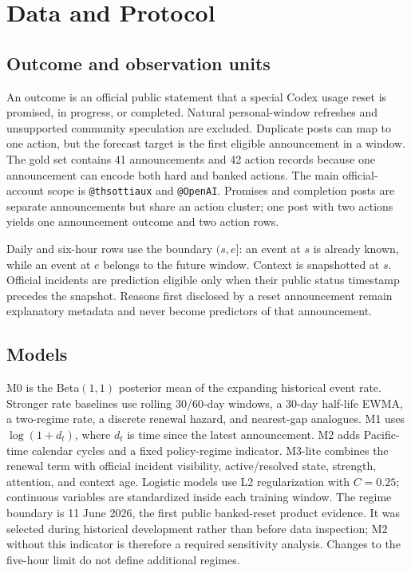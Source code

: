 \section{Data and Protocol}

\subsection{Outcome and observation units}

An outcome is an official public statement that a special Codex usage reset is promised, in
progress, or completed. Natural personal-window refreshes and unsupported community speculation are
excluded. Duplicate posts can map to one action, but the forecast target is the first eligible
announcement in a window. The gold set contains 41 announcements and 42 action records because one
announcement can encode both hard and banked actions. The main official-account scope is
\texttt{@thsottiaux} and \texttt{@OpenAI}. Promises and completion posts are separate announcements
but share an action cluster; one post with two actions yields one announcement outcome and two action
rows.

Daily and six-hour rows use the boundary $(s,e]$: an event at $s$ is already known, while an event at
$e$ belongs to the future window. Context is snapshotted at $s$. Official incidents are prediction
eligible only when their public status timestamp precedes the snapshot. Reasons first disclosed by a
reset announcement remain explanatory metadata and never become predictors of that announcement.

\subsection{Models}

M0 is the Beta$(1,1)$ posterior mean of the expanding historical event rate. Stronger rate
baselines use rolling 30/60-day windows, a 30-day half-life EWMA, a two-regime rate, a discrete
renewal hazard, and nearest-gap analogues. M1 uses
$\log(1+d_t)$, where $d_t$ is time since the latest announcement. M2 adds Pacific-time calendar
cycles and a fixed policy-regime indicator. M3-lite combines the renewal term with official
incident visibility, active/resolved state, strength, attention, and context age. Logistic models
use L2 regularization with $C=0.25$; continuous variables are standardized inside each training
window. The regime boundary is 11 June 2026, the first public banked-reset product evidence. It was
selected during historical development rather than before data inspection; M2 without this
indicator is therefore a required sensitivity analysis. Changes to the five-hour limit do not
define additional regimes.

